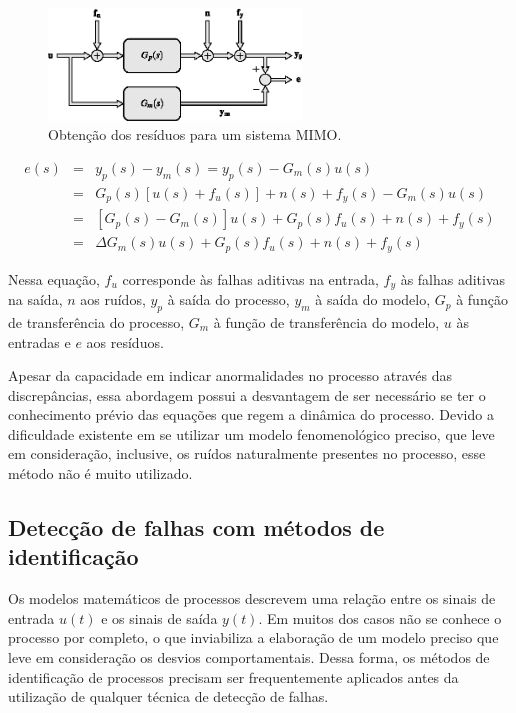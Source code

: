 
\begin{figure}[htb]
\centering
    \includegraphics[width=0.6\textwidth]{imgs/detec_diag/eps/residuos}
    \caption{Obtenção dos resíduos para um sistema MIMO.}
    \label{fig:residuos}
\end{figure}

\begin{eqnarray}\label{eq:residuos}
e(s) & = & y_p(s) - y_m(s) = y_p(s) - G_m(s)u(s)\nonumber\\
& = & G_p(s)\left[u(s) + f_u(s)\right] + n(s) + f_y(s) - G_m(s)u(s)\nonumber\\
& = & \left[G_p(s) - G_m(s)\right]u(s) + G_p(s)f_u(s) + n(s) + f_y(s)\nonumber\\
& = & \Delta G_m(s) u(s) + G_p(s)f_u(s) + n(s) + f_y(s)
\end{eqnarray}

Nessa equação, $f_u$ corresponde às falhas aditivas na entrada, $f_y$ às falhas
aditivas na saída, $n$ aos ruídos, $y_p$ à saída do processo, $y_m$ à saída do
modelo, $G_p$ à função de transferência do processo, $G_m$ à função de
transferência do modelo, $u$ às entradas e $e$ aos resíduos.


Apesar da capacidade em indicar anormalidades no processo através das
discrepâncias, essa abordagem possui a desvantagem de ser necessário se ter o
conhecimento prévio das equações que regem a dinâmica do processo. Devido a
dificuldade existente em se utilizar um modelo fenomenológico preciso, que leve
em consideração, inclusive, os ruídos naturalmente presentes no processo, esse
método não é muito utilizado.

\subsection{Detecção de falhas com métodos de identificação}
Os modelos matemáticos de processos descrevem uma relação entre os sinais de
entrada $u(t)$ e os sinais de saída $y(t)$. Em muitos dos casos não se conhece o
processo por completo, o que inviabiliza a elaboração de um modelo preciso que
leve em consideração os desvios comportamentais. Dessa forma, os métodos de
identificação de processos precisam ser frequentemente aplicados antes da
utilização de qualquer técnica de detecção de falhas.

